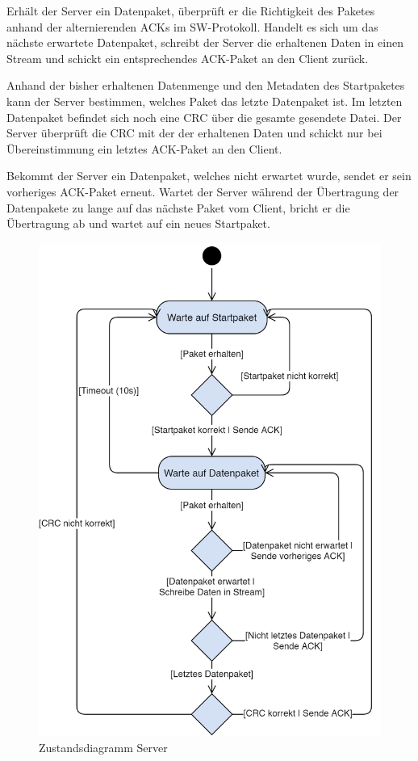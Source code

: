 \documentclass{article}
\begin{document}
		Erhält der Server ein Datenpaket, überprüft er die Richtigkeit des Paketes anhand der alternierenden ACKs im SW-Protokoll. Handelt es sich um das nächste erwartete Datenpaket, schreibt der Server die erhaltenen Daten in einen Stream und schickt ein entsprechendes ACK-Paket an den Client zurück.

		Anhand der bisher erhaltenen Datenmenge und den Metadaten des Startpaketes kann der Server bestimmen, welches Paket das letzte Datenpaket ist. Im letzten Datenpaket befindet sich noch eine CRC über die gesamte gesendete Datei. Der Server überprüft die CRC mit der der erhaltenen Daten und schickt nur bei Übereinstimmung ein letztes ACK-Paket an den Client.

		Bekommt der Server ein Datenpaket, welches nicht erwartet wurde, sendet er sein vorheriges ACK-Paket erneut. Wartet der Server während der Übertragung der Datenpakete zu lange auf das nächste Paket vom Client, bricht er die Übertragung ab und wartet auf ein neues Startpaket.

		\begin{figure}
			\centering
			\includegraphics[scale=0.3]{zustandsdiagramm_server.png}
			\caption{Zustandsdiagramm Server}
		\end{figure}
\end{document}
